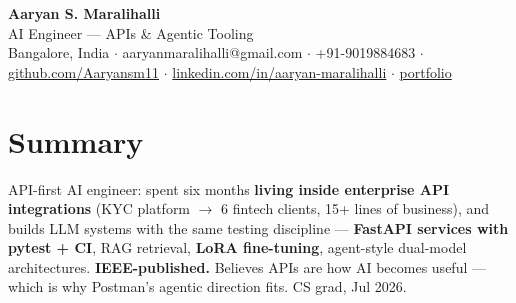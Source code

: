 \documentclass[10pt,a4paper]{article}
\begin{document}
\vspace*{-1cm}
\begin{center}
{\LARGE\bfseries Aaryan S. Maralihalli}\\[0.5em]
{\large AI Engineer --- APIs \& Agentic Tooling}\\[0.3em]
Bangalore, India $\cdot$ aaryanmaralihalli@gmail.com $\cdot$ +91-9019884683 $\cdot$ \href{https://github.com/Aaryansm11}{github.com/Aaryansm11} $\cdot$ \href{https://linkedin.com/in/aaryan-maralihalli}{linkedin.com/in/aaryan-maralihalli} $\cdot$ \href{https://portfolio-zeta-ten-85.vercel.app}{portfolio}
\end{center}\vspace{0.4ex}
\section*{Summary}
API-first AI engineer: spent six months \textbf{living inside enterprise API integrations} (KYC platform $\rightarrow$ 6 fintech clients, 15+ lines of business), and builds LLM systems with the same testing discipline --- \textbf{FastAPI services with pytest + CI}, RAG retrieval, \textbf{LoRA fine-tuning}, agent-style dual-model architectures. \textbf{IEEE-published.} Believes APIs are how AI becomes useful --- which is why Postman's agentic direction fits. CS grad, Jul 2026.\par\vspace{2pt}
\end{document}
